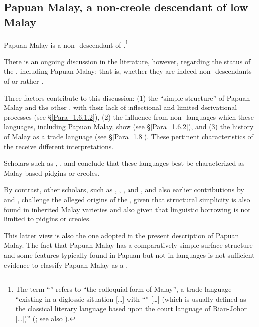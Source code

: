 \newpage  %
\subsection{Papuan Malay, a non-{creole} descendant of low Malay}\label{Para_1.2.2}
Papuan Malay is a non- descendant of .\footnote{The term  ``'' refers to  ``the colloquial form of Malay'', a trade language  ``existing in a diglossic situation [\ldots] with  ``'' [\ldots] (which is usually defined as the classical literary language based upon the court language of Riau-Johor [\ldots])'' (\citealt[18–19]{Paauw.2003}; see also \citealt[18–25]{Paauw.2009}).}

There is an ongoing discussion in the literature, however, regarding the status of the , including Papuan Malay; that is, whether they are indeed non- descendants of  or rather .

Three factors contribute to this discussion: (1) the ``simple structure'' of Papuan Malay and the other , with their lack of inflectional  and limited derivational processes (see §\ref{Para_1.6.1.2}), (2) the influence from non- languages which these languages, including Papuan Malay, show (see §\ref{Para_1.6.2}), and (3) the history of Malay as a trade language (see §\ref{Para_1.8}). These pertinent characteristics of the  receive different interpretations.

Scholars such as {\citet[675]{Adelaar.1996}, } \citet{Donohue.2007b, Donohue.2011}, and \citet{McWhorter.2001} conclude that these languages best be characterized as Malay-based pidgins or creoles.

By contrast, other scholars, such as {\cite{Collins.1980}}, {\citet{Gil.2001}}, {\citet{Bisang.2009}}, and {\citet{Paauw.2013}}, and also earlier contributions by \citet{Donohue.2003} and \citet{Donohue.1998}, challenge the alleged  origins of the , given that structural simplicity is also found in inherited Malay varieties and also given that linguistic borrowing is not limited to pidgins or creoles.

This latter view is also the one adopted in the present description of Papuan Malay. The fact that Papuan Malay has a comparatively simple surface structure and some features typically found in Papuan but not in  languages is not sufficient evidence to classify Papuan Malay as a .

